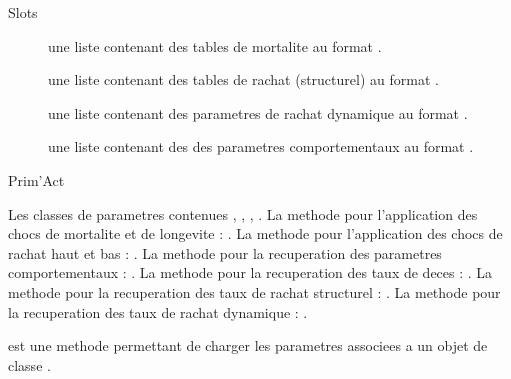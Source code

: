 \documentclass[a4paper]{book}
\begin{document}
%
\begin{Section}{Slots}

\begin{description}

\item[] une liste contenant des tables de mortalite au format .

\item[] une liste contenant des tables de rachat (structurel) au format .

\item[] une liste contenant des parametres de rachat dynamique
au format .

\item[] une liste contenant des des parametres comportementaux au format .

\end{description}
\end{Section}
%
\begin{Author}\relax
Prim'Act
\end{Author}
%
\begin{SeeAlso}\relax
Les classes de parametres contenues , ,
, .
La methode pour l'application des chocs de mortalite et de longevite : .
La methode pour l'application des chocs de rachat haut et bas : .
La methode pour la recuperation des parametres comportementaux : .
La methode pour la recuperation des taux de deces : .
La methode pour la recuperation des taux de rachat structurel : .
La methode pour la recuperation des taux de rachat dynamique : .
\end{SeeAlso}
%
\begin{Description}\relax
{} est une methode permettant de charger les parametres associees a un
objet de classe .
\end{Description}
\end{document}
